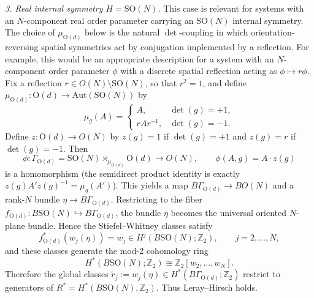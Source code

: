 \documentclass[aps,prx,reprint,superscriptaddress,twocolumn,amsmath,amssymb,amsfonts, nofootinbib]{revtex4-2}
\newcommand{\SO}{\text{SO}}
\newcommand{\Z}{\mathbb{Z}}
\theoremstyle{apsstyle}
\begin{document}
\textit{3. Real internal symmetry $H=\mathrm{SO}(N)$.} This case is relevant for systems with an $N$-component real order parameter carrying an $\SO(N)$ internal symmetry. The choice of $\mu_{\mathrm{O}(d)}$ below is the natural $\det$-coupling in which orientation-reversing spatial symmetries act by conjugation implemented by a reflection. For example, this would be an appropriate description for a system with an $N$-component order parameter $\phi$ with a discrete spatial reflection acting as $\phi \mapsto r\phi$. 
Fix a reflection $r\in O(N)\setminus \SO(N)$, so that $r^{2}=1$, and define $\mu_{\mathrm{O}(d)}:\mathrm{O}(d)\to \mathrm{Aut}(\SO(N))$ by  
\begin{equation*}
\mu_g(A)=\begin{cases}  
A,& \det(g)=+1,\\  
rAr^{-1},& \det(g)=-1.  
\end{cases}  
\end{equation*}
Define $z:\mathrm{O}(d)\to O(N)$ by $z(g)=1$ if $\det(g)=+1$ and $z(g)=r$ if $\det(g)=-1$. Then  
\begin{equation*}
\phi:\Gamma_{\mathrm{O}(d)}=\SO(N)\rtimes_{\mu_{\mathrm{O}(d)}} \mathrm{O}(d)\to O(N),\qquad \phi(A,g)=A\cdot z(g)  
\end{equation*}
is a homomorphism (the semidirect product identity is exactly $z(g)A'z(g)^{-1}=\mu_g(A')$). This yields a map $B\Gamma_{\mathrm{O}(d)}\to BO(N)$ and a rank-$N$ bundle $\eta\to B\Gamma_{\mathrm{O}(d)}$. Restricting to the fiber $f_{\mathrm{O}(d)}:B\SO(N)\hookrightarrow B\Gamma_{\mathrm{O}(d)}$, the bundle $\eta$ becomes the universal oriented $N$-plane bundle. Hence the Stiefel–Whitney classes satisfy  
\begin{equation*}
f_{\mathrm{O}(d)}^{*}(w_j(\eta))=w_j \in H^j(B\SO(N);\mathbb Z_2),\qquad j=2,\dots,N,  
\end{equation*}
and these classes generate the mod-2 cohomology ring  
\begin{equation*}
H^{*}(B\SO(N);\mathbb Z_2)\cong \mathbb Z_2[w_2,\dots,w_N].
\end{equation*}
Therefore the global classes $\widetilde{r}_j:=w_j(\eta)\in H^{*}(B\Gamma_{\mathrm{O}(d)};\mathbb Z_2)$ restrict to generators of $R^{*}= H^{*}(B\SO(N), \Z_{2})$. Thus Leray–Hirsch holds.



\bigskip 
\end{document}
